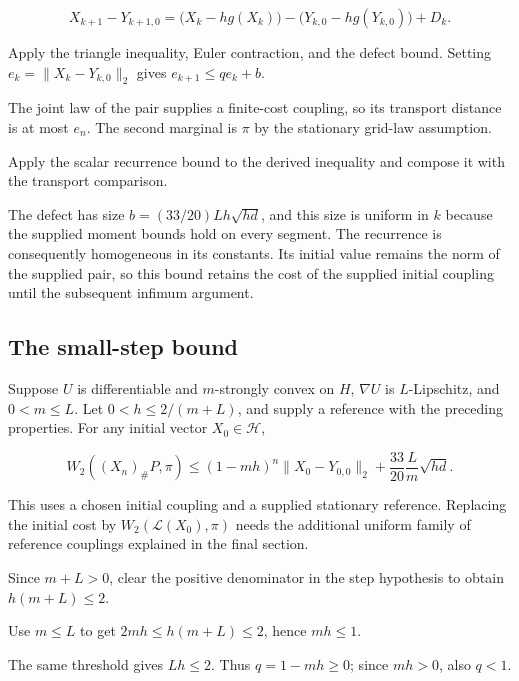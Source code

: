 \documentclass[11pt,a4paper]{report}
\begin{document}
\[X_{k+1}-Y_{k+1,0}=\bigl(X_k-hg(X_k)\bigr)-\bigl(Y_{k,0}-hg(Y_{k,0})\bigr)+D_k.\]

Apply the triangle inequality, Euler contraction, and the defect bound. Setting \(e_k=\|X_k-Y_{k,0}\|_2\) gives \(e_{k+1}\le qe_k+b\).



The joint law of the pair supplies a finite-cost coupling, so its transport distance is at most \(e_n\). The second marginal is \(\pi\) by the stationary grid-law assumption.



Apply the scalar recurrence bound to the derived inequality and compose it with the transport comparison.



The defect has size \(b=(33/20)Lh\sqrt{hd}\), and this size is uniform in \(k\) because the supplied moment bounds hold on every segment. The recurrence is consequently homogeneous in its constants. Its initial value remains the norm of the supplied pair, so this bound retains the cost of the supplied initial coupling until the subsequent infimum argument.

\subsection{\texorpdfstring{The small-step bound}{The small-step bound}}
\label{report-step-UnadjustedLangevin-HilbertDalalyan-lean-5}


Suppose \(U\) is differentiable and \(m\)-strongly convex on \(H\), \(\nabla U\) is \(L\)-Lipschitz, and \(0<m\le L\). Let \(0<h\le2/(m+L)\), and supply a reference with the preceding properties. For any initial vector \(X_0\in\mathcal H\),

\[W_2((X_n)_\#P,\pi)\le(1-mh)^n\|X_0-Y_{0,0}\|_2+\frac{33}{20}\frac Lm\sqrt{hd}.\]

This uses a chosen initial coupling and a supplied stationary reference. Replacing the initial cost by \(W_2(\mathcal L(X_0),\pi)\) needs the additional uniform family of reference couplings explained in the final section.



Since \(m+L>0\), clear the positive denominator in the step hypothesis to obtain \(h(m+L)\le2\).



Use \(m\le L\) to get \(2mh\le h(m+L)\le2\), hence \(mh\le1\).



The same threshold gives \(Lh\le2\). Thus \(q=1-mh\ge0\); since \(mh>0\), also \(q<1\).
\end{document}
